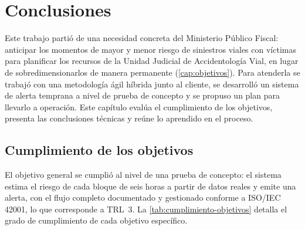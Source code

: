 \chapter{Conclusiones}\label{cap:conclusiones}

Este trabajo partió de una necesidad concreta del Ministerio Público Fiscal: anticipar los momentos de mayor y menor riesgo de siniestros viales con víctimas para planificar los recursos de la Unidad Judicial de Accidentología Vial, en lugar de sobredimensionarlos de manera permanente (\cref{cap:objetivos}). Para atenderla se trabajó con una metodología ágil híbrida junto al cliente, se desarrolló un sistema de alerta temprana a nivel de prueba de concepto y se propuso un plan para llevarlo a operación. Este capítulo evalúa el cumplimiento de los objetivos, presenta las conclusiones técnicas y reúne lo aprendido en el proceso.

\section{Cumplimiento de los objetivos}\label{sec:cumplimiento-objetivos}

El objetivo general se cumplió al nivel de una prueba de concepto: el sistema estima el riesgo de cada bloque de seis horas a partir de datos reales y emite una alerta, con el flujo completo documentado y gestionado conforme a ISO/IEC 42001, lo que corresponde a TRL~3. La \cref{tab:cumplimiento-objetivos} detalla el grado de cumplimiento de cada objetivo específico.

